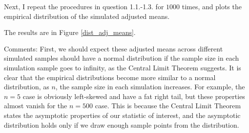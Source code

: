 \documentclass[12pt]{article}
\theoremstyle{definition}
\begin{document}
Next, I repeat the procedures in question 1.1.-1.3. for $1000$ times, and plots the empirical distribution of the simulated adjusted means. 

The results are in Figure \ref{dist_adj_means}.

Comments: First, we should expect these adjusted means across different simulated samples should have a normal distribution if the sample size in each simulation sample goes to infinity, as the Central Limit Theorem suggests. It is clear that the empirical distributions become more similar to a normal distribution, as $n$, the sample size in each simulation increases. For example, the $n=5$ case is obviously left-skewed and have a fat right tail, but these properties almost vanish for the $n = 500$ case. This is because the Central Limit Theorem states the asymptotic properties of our statistic of interest, and the asymptotic distribution holds only if we draw enough sample points from the distribution. 
\end{document}
